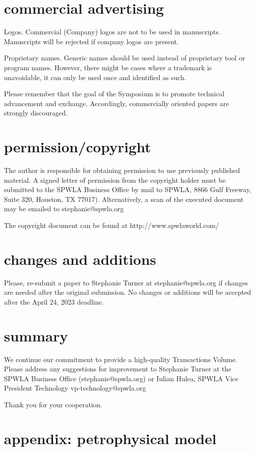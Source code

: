 \documentclass[10pt,twocolumn,twoside]{article}
\begin{document}
\section{commercial advertising}
Logos. Commercial (Company) logos are not to be used in manuscripts.  Manuscripts will be rejected if company logos are present. 

Proprietary names. Generic names should be used instead of proprietary tool or program names. However, there might be cases where a trademark is unavoidable, it can only be used once and identified as such.

Please remember that the goal of the Symposium is to promote technical advancement and exchange. Accordingly, commercially oriented papers are strongly discouraged.

\section{permission/copyright}
The author is responsible for obtaining permission to use previously published material. A signed letter of permission from the copyright holder must be submitted to the SPWLA Business Office by mail to SPWLA, 8866 Gulf Freeway, Suite 320, Houston, TX 77017). Alternatively, a scan of the executed document may be emailed to stephanie@spwla.org 

The copyright document can be found at http://www.spwlaworld.com/ 

\section{changes and additions}
Please, re-submit a paper to Stephanie Turner at stephanie@spwla.org if changes
are needed after the original submission. No changes or additions will be
accepted after the April 24, 2023 deadline.

\section{summary}
We continue our commitment to provide a high-quality Transactions Volume. Please
address any suggestions for improvement to Stephanie Turner at the SPWLA
Business Office (stephanie@spwla.org) or Iulian Hulea, SPWLA Vice President Technology 
vp-technology@spwla.org

Thank you for your cooperation.

\section{appendix: petrophysical model}
\end{document}
